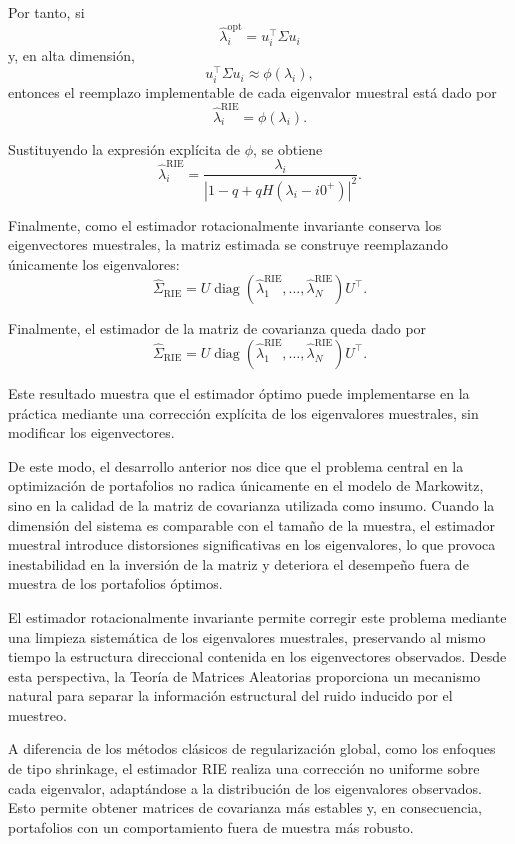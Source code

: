 \documentclass[letterpaper,12pt,oneside]{book}
\begin{document}
Por tanto, si
\[
\widehat{\lambda}_i^{\mathrm{opt}}
=
u_i^\top \Sigma u_i
\]
y, en alta dimensión,
\[
u_i^\top \Sigma u_i
\approx
\phi(\lambda_i),
\]
entonces el reemplazo implementable de cada eigenvalor muestral está dado por
\[
\widehat{\lambda}_i^{\mathrm{RIE}}
=
\phi(\lambda_i).
\]

Sustituyendo la expresión explícita de $\phi$, se obtiene
\[
\widehat{\lambda}_i^{\mathrm{RIE}}
=
\frac{\lambda_i}
{\left|1-q+qH(\lambda_i-i0^+)\right|^2}.
\]

Finalmente, como el estimador rotacionalmente invariante conserva los eigenvectores muestrales, la matriz estimada se construye reemplazando únicamente los eigenvalores:
\[
\widehat{\Sigma}_{\mathrm{RIE}}
=
U
\operatorname{diag}
\left(
\widehat{\lambda}_1^{\mathrm{RIE}},
\dots,
\widehat{\lambda}_N^{\mathrm{RIE}}
\right)
U^\top.
\]

Finalmente, el estimador de la matriz de covarianza queda dado por
\[
\widehat{\Sigma}_{\mathrm{RIE}}
=
U
\operatorname{diag}
\left(
\widehat{\lambda}_1^{\mathrm{RIE}},
\dots,
\widehat{\lambda}_N^{\mathrm{RIE}}
\right)
U^\top.
\]

Este resultado muestra que el estimador óptimo puede implementarse en la práctica mediante una corrección explícita de los eigenvalores muestrales, sin modificar los eigenvectores.

De este modo, el desarrollo anterior nos dice que el problema central en la optimización de portafolios no radica únicamente en el modelo de Markowitz, sino en la calidad de la matriz de covarianza utilizada como insumo. Cuando la dimensión del sistema es comparable con el tamaño de la muestra, el estimador muestral introduce distorsiones significativas en los eigenvalores, lo que provoca inestabilidad en la inversión de la matriz y deteriora el desempeño fuera de muestra de los portafolios óptimos.

El estimador rotacionalmente invariante permite corregir este problema mediante una limpieza sistemática de los eigenvalores muestrales, preservando al mismo tiempo la estructura direccional contenida en los eigenvectores observados. Desde esta perspectiva, la Teoría de Matrices Aleatorias proporciona un mecanismo natural para separar la información estructural del ruido inducido por el muestreo.

A diferencia de los métodos clásicos de regularización global, como los enfoques de tipo shrinkage, el estimador RIE realiza una corrección no uniforme sobre cada eigenvalor, adaptándose a la distribución de los eigenvalores observados. Esto permite obtener matrices de covarianza más estables y, en consecuencia, portafolios con un comportamiento fuera de muestra más robusto.
\end{document}
